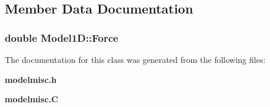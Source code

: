 \subsection{Member Data Documentation}
\subsubsection{\setlength{\rightskip}{0pt plus 5cm}double Model1D::Force}\label{classModel1D_m0}




The documentation for this class was generated from the following files:\begin{CompactItemize}
\item 
{\bf modelmisc.h}\item 
{\bf modelmisc.C}\end{CompactItemize}
